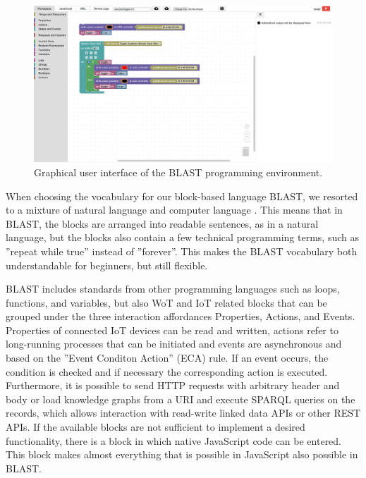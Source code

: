 \documentclass[runningheads]{llncs}
\begin{document}
\begin{figure}
\includegraphics[width=\textwidth]{Blast Screenshot.png}%
\caption{Graphical user interface of the BLAST programming environment.} \label{fig1}
\end{figure}

When choosing the vocabulary for our block-based language BLAST, we resorted to a mixture of natural language and computer language \cite{8120404}.
This means that in BLAST, the blocks are arranged into readable sentences, as in a natural language, but the blocks also contain a few technical programming terms, such as ''repeat while true'' instead of ''forever''.
This makes the BLAST vocabulary both understandable for beginners, but still flexible.

BLAST includes standards from other programming languages such as loops, functions, and variables, but also WoT and IoT related blocks that can be grouped under the three interaction affordances Properties, Actions, and Events.
Properties of connected IoT devices can be read and written, actions refer to long-running processes that can be initiated and events are asynchronous and based on the ''Event Conditon Action'' (ECA) rule.
If an event occurs, the condition is checked and if necessary the corresponding action is executed.
Furthermore, it is possible to send HTTP requests with arbitrary header and body or load knowledge graphs from a URI and execute SPARQL queries on the records, which allows interaction with read-write linked data APIs or other REST APIs.
If the available blocks are not sufficient to implement a desired functionality, there is a block in which native JavaScript code can be entered.
This block makes almost everything that is possible in JavaScript also possible in BLAST.
\end{document}
